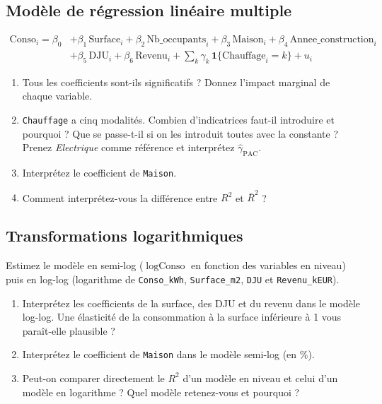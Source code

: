 \documentclass[11pt,a4paper]{article}
\newcommand{\var}[1]{\texttt{#1}}
\begin{document}
\subsection{Modèle de régression linéaire multiple}
\begin{modelbox}
\begin{equation}
\begin{aligned}
\text{Conso}_i = \beta_0 &+ \beta_1\,\text{Surface}_i + \beta_2\,\text{Nb\_occupants}_i + \beta_3\,\text{Maison}_i + \beta_4\,\text{Annee\_construction}_i \\
&+ \beta_5\,\text{DJU}_i + \beta_6\,\text{Revenu}_i + \textstyle\sum_k \gamma_k\,\mathbf{1}\{\text{Chauffage}_i = k\} + u_i
\end{aligned}
\end{equation}
\end{modelbox}
\begin{enumerate}
  \item Tous les coefficients sont-ils significatifs ? Donnez l'impact marginal de chaque variable.
  \item \var{Chauffage} a cinq modalités. Combien d'indicatrices faut-il introduire et pourquoi ? Que se passe-t-il si on les introduit toutes avec la constante ? Prenez \textit{Electrique} comme référence et interprétez $\hat\gamma_{\text{PAC}}$.
  \item Interprétez le coefficient de \var{Maison}.
  \item Comment interprétez-vous la différence entre $R^2$ et $\bar R^2$ ?
\end{enumerate}

\subsection{Transformations logarithmiques}
Estimez le modèle en semi-log ($\log \text{Conso}$ en fonction des variables en niveau) puis en log-log (logarithme de \var{Conso\_kWh}, \var{Surface\_m2}, \var{DJU} et \var{Revenu\_kEUR}).
\begin{enumerate}
  \item Interprétez les coefficients de la surface, des DJU et du revenu dans le modèle log-log. Une élasticité de la consommation à la surface inférieure à 1 vous paraît-elle plausible ?
  \item Interprétez le coefficient de \var{Maison} dans le modèle semi-log (en \%).
  \item Peut-on comparer directement le $R^2$ d'un modèle en niveau et celui d'un modèle en logarithme ? Quel modèle retenez-vous et pourquoi ?
\end{enumerate}
\end{document}
